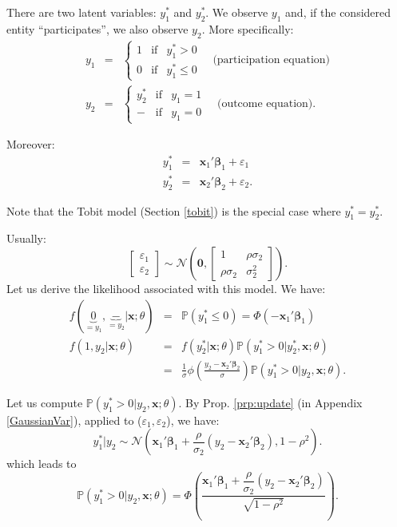 \documentclass[
  12pt,
]{book}
\theoremstyle{definition}
\theoremstyle{definition}
\theoremstyle{definition}
\theoremstyle{definition}
\theoremstyle{remark}
\begin{document}
There are two latent variables: \(y_1^*\) and \(y_2^*\). We observe \(y_1\) and, if the considered entity ``participates'', we also observe \(y_2\). More specifically:
\begin{eqnarray*}
y_1 &=& \left\{
\begin{array}{ccc}
1 &\mbox{if}& y_1^* > 0 \\
0 &\mbox{if}& y_1^* \le 0
\end{array}
\right. \quad \mbox{(participation equation)}\\
y_2 &=& \left\{
\begin{array}{ccc}
y_2^* &\mbox{if}& y_1 = 1 \\
- &\mbox{if}& y_1 = 0
\end{array}
\right. \quad \mbox{(outcome equation).}
\end{eqnarray*}

Moreover:
\begin{eqnarray*}
y_1^* &=& \mathbf{x}_1'\boldsymbol\beta_1 + \varepsilon_1 \\
y_2^* &=& \mathbf{x}_2'\boldsymbol\beta_2 + \varepsilon_2.
\end{eqnarray*}

Note that the Tobit model (Section \ref{tobit}) is the special case where \(y_1^*=y_2^*\).

Usually:
\[
\left[\begin{array}{c}\varepsilon_1\\\varepsilon_2\end{array}\right] \sim \mathcal{N}\left(\mathbf{0},
\left[
\begin{array}{cc}
1 & \rho  \sigma_2 \\
\rho  \sigma_2 & \sigma_2^2
\end{array}
\right]
\right).
\]
Let us derive the likelihood associated with this model. We have:
\begin{eqnarray}
f(\underbrace{0}_{=y_1},\underbrace{-}_{=y_2}|\mathbf{x};\theta) &=& \mathbb{P}(y_1^*\le 0) = \Phi(-\mathbf{x}_1'\boldsymbol\beta_1) \label{eq:probaPP1}\\
f(1,y_2|\mathbf{x};\theta) &=& f(y_2^*|\mathbf{x};\theta) \mathbb{P}(y_1^*>0|y_2^*,\mathbf{x};\theta) \nonumber \\
&=& \frac{1}{\sigma}\phi\left(\frac{y_2 - \mathbf{x}_2'\boldsymbol\beta_2}{\sigma}\right)  \mathbb{P}(y_1^*>0|y_2,\mathbf{x};\theta).\label{eq:probaPP2}
\end{eqnarray}

Let us compute \(\mathbb{P}(y_1^*>0|y_2,\mathbf{x};\theta)\). By Prop. \ref{prp:update} (in Appendix \ref{GaussianVar}), applied to (\(\varepsilon_1,\varepsilon_2\)), we have:
\[
y_1^*|y_2 \sim \mathcal{N}\left(\mathbf{x}_1'\boldsymbol\beta_1 + \frac{\rho}{\sigma_2}(y_2-\mathbf{x}_2'\boldsymbol\beta_2),1-\rho^2\right).
\]
which leads to
\begin{equation}
\mathbb{P}(y_1^*>0|y_2,\mathbf{x};\theta) = \Phi\left( \frac{\mathbf{x}_1'\boldsymbol\beta_1 + \dfrac{\rho}{\sigma_2}(y_2-\mathbf{x}_2'\boldsymbol\beta_2)}{\sqrt{1-\rho^2}}\right).\label{eq:probaPP3}
\end{equation}
\end{document}
